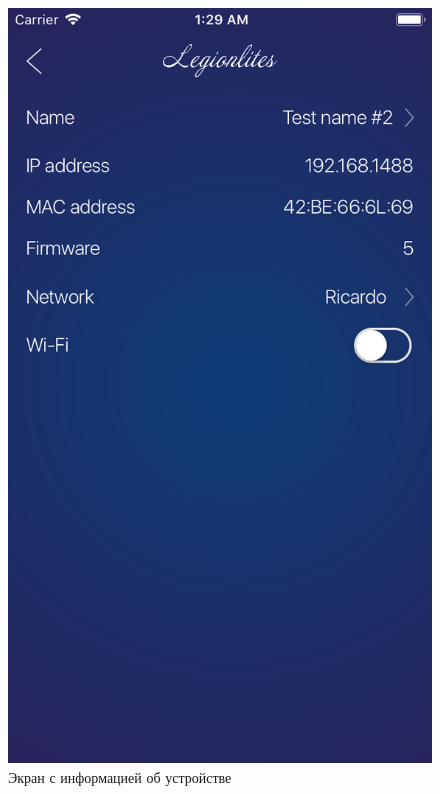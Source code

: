\begin{figure}[H]
\centering
	\includegraphics[scale=0.2]{figures/userGuide/deviceInfo.png}
	\caption{Экран с информацией об устройстве}
	\label{fig:develop:userGuide:deviceInfo}
\end{figure}
~
